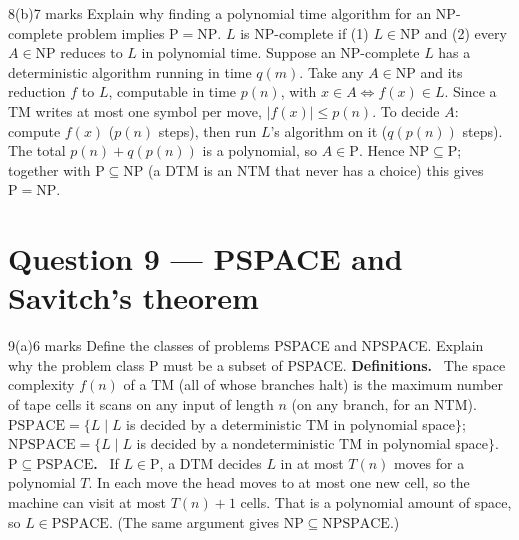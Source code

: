 \documentclass[10.5pt,a4paper]{article}
\newcommand{\ansh}[1]{\textbf{\color{exborder}#1}\ }
\newcommand{\NP}{\mathrm{NP}}
\renewcommand{\P}{\mathrm{P}}
\newcommand{\PS}{\mathrm{PSPACE}}
\newcommand{\NPS}{\mathrm{NPSPACE}}
\begin{document}
\begin{qa}{8(b)}{7 marks}
Explain why finding a polynomial time algorithm for an NP-complete problem implies $\P=\NP$.
\tcblower
$L$ is NP-complete if (1) $L\in\NP$ and (2) every $A\in\NP$ reduces to $L$ in polynomial time. Suppose an NP-complete $L$ has a deterministic
algorithm running in time $q(m)$. Take any $A\in\NP$ and its reduction $f$ to $L$, computable in time $p(n)$, with $x\in A\iff f(x)\in L$.
Since a TM writes at most one symbol per move, $|f(x)|\le p(n)$. To decide $A$: compute $f(x)$ ($p(n)$ steps), then run $L$'s algorithm on it
($q(p(n))$ steps). The total $p(n)+q(p(n))$ is a polynomial, so $A\in\P$. Hence $\NP\subseteq\P$; together with $\P\subseteq\NP$ (a DTM is an NTM
that never has a choice) this gives $\P=\NP$.
\end{qa}

\section{Question 9 --- PSPACE and Savitch's theorem}
\begin{qa}{9(a)}{6 marks}
Define the classes of problems PSPACE and NPSPACE. Explain why the problem class P must be a subset of PSPACE.
\tcblower
\ansh{Definitions.} The space complexity $f(n)$ of a TM (all of whose branches halt) is the maximum number of tape cells it scans on any input of
length $n$ (on any branch, for an NTM).
$\PS=\{L\mid L$ is decided by a deterministic TM in polynomial space$\}$;
$\NPS=\{L\mid L$ is decided by a nondeterministic TM in polynomial space$\}$.\\
\ansh{$\P\subseteq\PS$.} If $L\in\P$, a DTM decides $L$ in at most $T(n)$ moves for a polynomial $T$. In each move the head moves to at most one
new cell, so the machine can visit at most $T(n)+1$ cells. That is a polynomial amount of space, so $L\in\PS$. (The same argument gives
$\NP\subseteq\NPS$.)
\end{qa}
\end{document}

